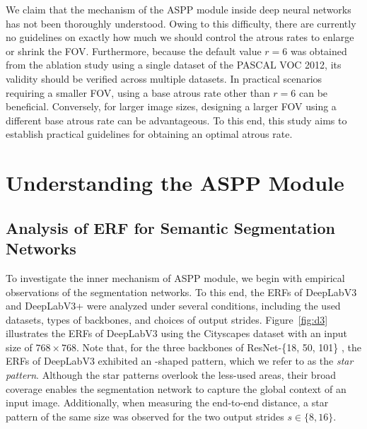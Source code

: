 \documentclass{article}
\def\figref#1{Figure~\ref{#1}}
\begin{document}
We claim that the mechanism of the ASPP module inside deep neural networks has not been thoroughly understood. Owing to this difficulty, there are currently no guidelines on exactly how much we should control the atrous rates to enlarge or shrink the FOV. Furthermore, because the default value $r=6$ was obtained from the ablation study using a single dataset of the PASCAL VOC 2012, its validity should be verified across multiple datasets. In practical scenarios requiring a smaller FOV, using a base atrous rate other than $r=6$ can be beneficial. Conversely, for larger image sizes, designing a larger FOV using a different base atrous rate can be advantageous. To this end, this study aims to establish practical guidelines for obtaining an optimal atrous rate.



\section{Understanding the ASPP Module}
\label{sec:understanding}

\subsection{Analysis of ERF for Semantic Segmentation Networks}
\label{sec:analsis}

To investigate the inner mechanism of ASPP module, we begin with empirical observations of the segmentation networks. To this end, the ERFs of DeepLabV3 and DeepLabV3+ were analyzed under several conditions, including the used datasets, types of backbones, and choices of output strides. \figref{fig:d3} illustrates the ERFs of DeepLabV3 using the Cityscapes dataset \citep{DBLP:conf/cvpr/CordtsORREBFRS16} with an input size of $768 \times 768$. Note that, for the three backbones of ResNet-\{18, 50, 101\} \citep{DBLP:conf/cvpr/HeZRS16}, the ERFs of DeepLabV3 exhibited an \EightStarTaper-shaped pattern, which we refer to as the \textit{star pattern}. Although the star patterns overlook the less-used areas, their broad coverage enables the segmentation network to capture the global context of an input image. Additionally, when measuring the end-to-end distance, a star pattern of the same size was observed for the two output strides $s \in \{8, 16\}$.
\end{document}
